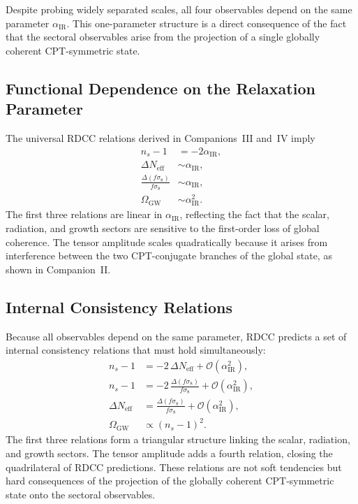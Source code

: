 \documentclass[11pt,a4paper]{article}
\begin{document}
Despite probing widely separated scales, all four observables depend on the same parameter
$\alpha_{\mathrm{IR}}$. This one-parameter structure is a direct consequence of the fact that the
sectoral observables arise from the projection of a single globally coherent CPT-symmetric
state.

\subsection{Functional Dependence on the Relaxation Parameter}

The universal RDCC relations derived in Companions~III and~IV imply
\begin{align}
    n_s - 1 &= -2\alpha_{\mathrm{IR}}, \\
    \Delta N_{\mathrm{eff}} &\sim \alpha_{\mathrm{IR}}, \\
    \frac{\Delta(f\sigma_8)}{f\sigma_8} &\sim \alpha_{\mathrm{IR}}, \\
    \Omega_{\mathrm{GW}} &\sim \alpha_{\mathrm{IR}}^2.
\end{align}
The first three relations are linear in $\alpha_{\mathrm{IR}}$, reflecting the fact that the scalar,
radiation, and growth sectors are sensitive to the first-order loss of global coherence. The tensor
amplitude scales quadratically because it arises from interference between the two CPT-conjugate
branches of the global state, as shown in Companion~II.

\subsection{Internal Consistency Relations}

Because all observables depend on the same parameter, RDCC predicts a set of internal
consistency relations that must hold simultaneously:
\begin{align}
    n_s - 1 &= -2\,\Delta N_{\mathrm{eff}} + \mathcal{O}(\alpha_{\mathrm{IR}}^2), \\
    n_s - 1 &= -2\,\frac{\Delta(f\sigma_8)}{f\sigma_8} + \mathcal{O}(\alpha_{\mathrm{IR}}^2), \\
    \Delta N_{\mathrm{eff}} &= \frac{\Delta(f\sigma_8)}{f\sigma_8} + \mathcal{O}(\alpha_{\mathrm{IR}}^2), \\
    \Omega_{\mathrm{GW}} &\propto (n_s - 1)^2.
\end{align}
The first three relations form a triangular structure linking the scalar, radiation, and growth
sectors. The tensor amplitude adds a fourth relation, closing the quadrilateral of RDCC
predictions. These relations are not soft tendencies but hard consequences of the projection of
the globally coherent CPT-symmetric state onto the sectoral observables.
\end{document}
